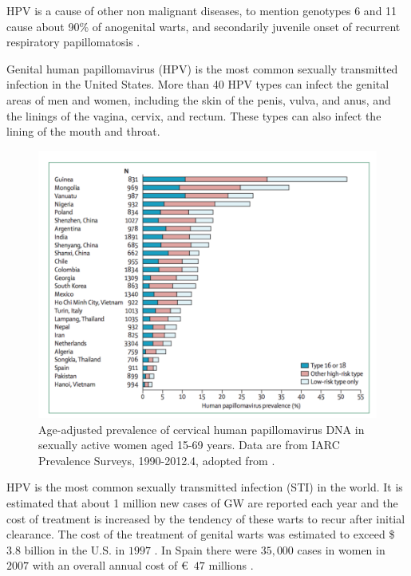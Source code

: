 HPV is a cause of other non malignant diseases, to mention genotypes 6 and 11 cause about 90\% of anogenital warts, and secondarily juvenile onset of recurrent respiratory papillomatosis \cite{lacey2006burden}.

Genital human papillomavirus (HPV) is the most common sexually transmitted infection in the United States. More than 40 HPV types can infect the genital areas of men and women, including the skin of the penis, vulva, and anus, and the linings of the vagina, cervix, and rectum. These types can also infect the lining of the mouth and throat.

\begin{figure}[ht]
	\centering
	\includegraphics[scale=0.7]{IMG/prevalence.png}
	\caption{Age-adjusted prevalence of cervical human papillomavirus DNA in sexually active women aged 15-69 years. Data are from IARC Prevalence Surveys, 1990-2012.4, adopted from \cite{Marx1986HumanPV}.}
	\label{ageAdjusted}
\end{figure} 

HPV is the most common sexually transmitted infection (STI) in the world. It is estimated that about 1 million new cases of GW are reported each year and the cost of treatment is increased by the tendency of these warts to recur after initial clearance. The cost of the treatment of genital warts was estimated to exceed \$ $3.8$ billion in the U.S. in $1997$ \cite{roberts1999vaccine}. In Spain there were $35,000$ cases in women in $2007$ with an overall annual cost of \euro \ $47$ millions \cite{castellsague2012prevalence}.

